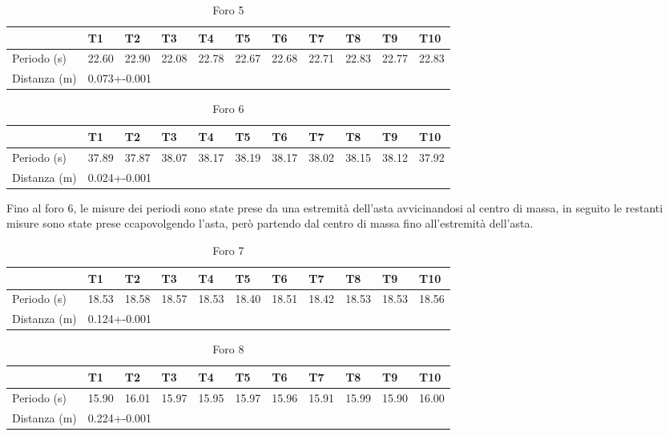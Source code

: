 \documentclass[a4paper,10pt]{article}
\begin{document}
\begin{table}[H]
\centering
\caption{Foro 5}
\label{my-label}
\begin{tabular}{|l|l|l|l|l|l|l|l|l|l|l|}
\hline
             & T1    & T2    & T3    & T4    & T5    & T6    & T7    & T8    & T9    & T10   \\ \hline
Periodo (s)  & 22.60 & 22.90 & 22.08 & 22.78 & 22.67 & 22.68 & 22.71 & 22.83 & 22.77 & 22.83 \\ \hline
Distanza (m) & \multicolumn{10}{l|}{0.073+-0.001}                                             \\ \hline
\end{tabular}
\end{table}
\begin{table}[H]
\centering
\caption{Foro 6}
\label{my-label}
\begin{tabular}{|l|l|l|l|l|l|l|l|l|l|l|}
\hline
             & T1    & T2    & T3    & T4    & T5    & T6    & T7    & T8    & T9    & T10   \\ \hline
Periodo (s)  & 37.89 & 37.87 & 38.07 & 38.17 & 38.19 & 38.17 & 38.02 & 38.15 & 38.12 & 37.92 \\ \hline
Distanza (m) & \multicolumn{10}{l|}{0.024+-0.001}                                             \\ \hline
\end{tabular}
\end{table}
Fino al foro 6, le misure dei periodi sono state prese da una estremità dell'asta avvicinandosi al centro di massa, in seguito
le restanti misure sono state prese ccapovolgendo l'asta, però partendo dal centro di massa fino all'estremità dell'asta.\\
\begin{table}[H]
\centering
\caption{Foro 7}
\label{my-label}
\begin{tabular}{|l|l|l|l|l|l|l|l|l|l|l|}
\hline
             & T1    & T2    & T3    & T4    & T5    & T6    & T7    & T8    & T9    & T10   \\ \hline
Periodo (s)  & 18.53 & 18.58 & 18.57 & 18.53 & 18.40 & 18.51 & 18.42 & 18.53 & 18.53 & 18.56 \\ \hline
Distanza (m) & \multicolumn{10}{l|}{0.124+-0.001}                                             \\ \hline
\end{tabular}
\end{table}
\begin{table}[H]
\centering
\caption{Foro 8}
\label{my-label}
\begin{tabular}{|l|l|l|l|l|l|l|l|l|l|l|}
\hline
             & T1    & T2    & T3    & T4    & T5    & T6    & T7    & T8    & T9    & T10   \\ \hline
Periodo (s)  & 15.90 & 16.01 & 15.97 & 15.95 & 15.97 & 15.96 & 15.91 & 15.99 & 15.90 & 16.00 \\ \hline
Distanza (m) & \multicolumn{10}{l|}{0.224+-0.001}                                             \\ \hline
\end{tabular}
\end{table}
\end{document}
